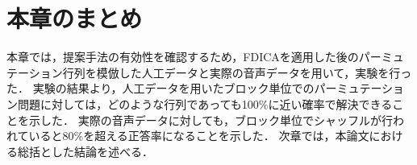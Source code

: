 \clearpage




\clearpage
\section{本章のまとめ}
\label{sec:matome}
本章では，提案手法の有効性を確認するため，FDICAを適用した後のパーミュテーション行列を模倣した人工データと実際の音声データを用いて，実験を行った．
実験の結果より，人工データを用いたブロック単位でのパーミュテーション問題に対しては，どのような行列であっても100\%に近い確率で解決できることを示した．
実際の音声データに対しても，ブロック単位でシャッフルが行われていると80\%を超える正答率になることを示した．
次章では，本論文における総括とした結論を述べる．
